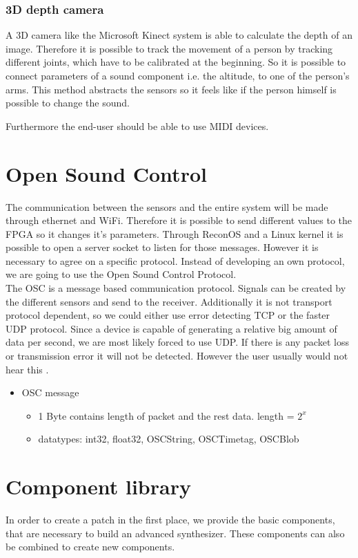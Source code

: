 \subsubsection{3D depth camera}
A 3D camera like the Microsoft Kinect system is able to calculate the depth of an image. Therefore it is possible to track the movement of a person by tracking different joints, which have to be calibrated at the beginning. So it is possible to connect parameters of a sound component i.e. the altitude, to one of the person's arms. This method abstracts the sensors so it feels like if the person himself is possible to change the sound.

Furthermore the end-user should be able to use MIDI devices.

\section{Open Sound Control}
The communication between the sensors and the entire system will be made through ethernet and WiFi. Therefore it is possible to send different values to the \ac{FPGA} so it changes it's parameters. Through ReconOS and a Linux kernel it is possible to open a server socket to listen for those messages. However it is necessary to agree on a specific protocol. Instead of developing an own protocol, we are going to use the Open Sound Control Protocol. \\
The OSC is a message based communication protocol. Signals can be created by the different sensors and send to the receiver. Additionally it is not transport protocol dependent, so we could either use error detecting TCP or the faster UDP protocol. Since a device is capable of generating a relative big amount of data per second, we are most likely forced to use UDP. If there is any packet loss or transmission error it will not be detected. However the user usually would not hear this .  
\begin{itemize}
\item{OSC message}
\begin{itemize}
\item{1 Byte contains length of packet and the rest data. length = $2^x$}
\item{datatypes: int32, float32, OSCString, OSCTimetag, OSCBlob}
\end{itemize}
\end{itemize}

\section{Component library}
In order to create a patch in the first place, we provide the basic components, that are necessary to build an advanced synthesizer. These components can also be combined to create new components.


